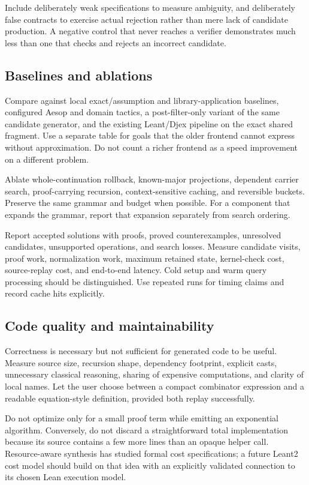 \documentclass[11pt,letterpaper]{article}
\theoremstyle{definition}\newtheorem{definition}[theorem]{Definition}
\theoremstyle{remark}\newtheorem{remark}[theorem]{Remark}
\begin{document}
Include deliberately weak specifications to measure ambiguity, and deliberately
false contracts to exercise actual rejection rather than mere lack of candidate
production. A negative control that never reaches a verifier demonstrates much
less than one that checks and rejects an incorrect candidate.

\subsection{Baselines and ablations}

Compare against local exact/assumption and library-application baselines,
configured Aesop and domain tactics, a post-filter-only variant of the same
candidate generator, and the existing Leant/Djex pipeline on the exact shared
fragment. Use a separate table for goals that the older frontend cannot express
without approximation. Do not count a richer frontend as a speed improvement on
a different problem.

Ablate whole-continuation rollback, known-major projections, dependent carrier
search, proof-carrying recursion, context-sensitive caching, and reversible
buckets. Preserve the same grammar and budget when possible. For a component
that expands the grammar, report that expansion separately from search ordering.

Report accepted solutions with proofs, proved counterexamples, unresolved
candidates, unsupported operations, and search losses. Measure candidate visits,
proof work, normalization work, maximum retained state, kernel-check cost,
source-replay cost, and end-to-end latency. Cold setup and warm query processing
should be distinguished. Use repeated runs for timing claims and record cache
hits explicitly.

\subsection{Code quality and maintainability}

Correctness is necessary but not sufficient for generated code to be useful.
Measure source size, recursion shape, dependency footprint, explicit casts,
unnecessary classical reasoning, sharing of expensive computations, and clarity
of local names. Let the user choose between a compact combinator expression and
a readable equation-style definition, provided both replay successfully.

Do not optimize only for a small proof term while emitting an exponential
algorithm. Conversely, do not discard a straightforward total implementation
because its source contains a few more lines than an opaque helper call.
Resource-aware synthesis has studied formal cost specifications; a future
Leant2 cost model should build on that idea with an explicitly validated
connection to its chosen Lean execution model.\cite{resources}
\end{document}
